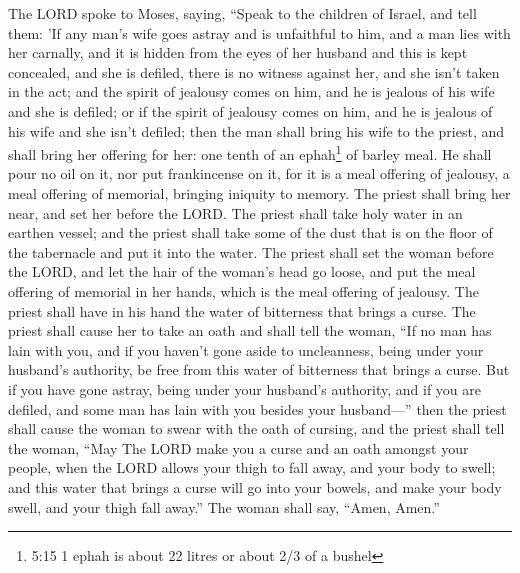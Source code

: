 The LORD spoke to Moses, saying,  ``Speak to
the children of Israel, and tell them: 'If any man's wife goes astray
and is unfaithful to him,  and a man lies with her
carnally, and it is hidden from the eyes of her husband and this is kept
concealed, and she is defiled, there is no witness against her, and she
isn't taken in the act;  and the spirit of jealousy comes
on him, and he is jealous of his wife and she is defiled; or if the
spirit of jealousy comes on him, and he is jealous of his wife and she
isn't defiled;  then the man shall bring his wife to the
priest, and shall bring her offering for her: one tenth of an
ephah\footnote{5:15 1 ephah is about 22 litres or about 2/3 of a bushel}
of barley meal. He shall pour no oil on it, nor put frankincense on it,
for it is a meal offering of jealousy, a meal offering of memorial,
bringing iniquity to memory.  The priest shall bring her
near, and set her before the LORD.  The priest shall take
holy water in an earthen vessel; and the priest shall take some of the
dust that is on the floor of the tabernacle and put it into the water.
 The priest shall set the woman before the LORD, and let
the hair of the woman's head go loose, and put the meal offering of
memorial in her hands, which is the meal offering of jealousy. The
priest shall have in his hand the water of bitterness that brings a
curse.  The priest shall cause her to take an oath and
shall tell the woman, ``If no man has lain with you, and if you haven't
gone aside to uncleanness, being under your husband's authority, be free
from this water of bitterness that brings a curse.  But if
you have gone astray, being under your husband's authority, and if you
are defiled, and some man has lain with you besides your husband---''
 then the priest shall cause the woman to swear with the
oath of cursing, and the priest shall tell the woman, ``May The LORD
make you a curse and an oath amongst your people, when the LORD allows
your thigh to fall away, and your body to swell;  and this
water that brings a curse will go into your bowels, and make your body
swell, and your thigh fall away.'' The woman shall say, ``Amen, Amen.''


